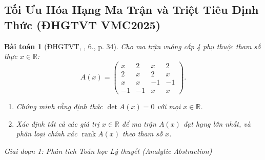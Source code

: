 \documentclass{article}
\newtheorem{baitoan}{Bài toán}
\begin{document}



\subsection{Tối Ưu Hóa Hạng Ma Trận và Triệt Tiêu Định Thức (ĐHGTVT VMC2025)}

\begin{baitoan}[ĐHGTVT, \cite{VMS_VMC2025}, 6., p. 34]
Cho ma trận vuông cấp 4 phụ thuộc tham số thực $x \in \mathbb{R}$:
\begin{equation}
    A(x) = \begin{pmatrix}
        x & 2 & x & 2 \\
        2 & x & 2 & x \\
        x & x & -1 & -1 \\
        -1 & -1 & x & x
    \end{pmatrix}.
\end{equation}
\begin{enumerate}
    \item[(a)] Chứng minh rằng định thức $\det A(x) = 0$ với mọi $x \in \mathbb{R}$.
    \item[(b)] Xác định tất cả các giá trị $x \in \mathbb{R}$ để ma trận $A(x)$ đạt hạng lớn nhất, và phân loại chính xác $\operatorname{rank} A(x)$ theo tham số $x$.
\end{enumerate}
\end{baitoan}

\vspace{0.5em}\noindent\emph{Giai đoạn 1: Phân tích Toán học Lý thuyết (Analytic Abstraction)}
\end{document}
